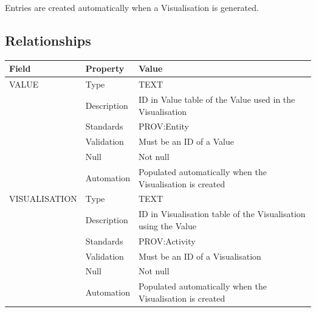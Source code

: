 Entries are created automatically when a Visualisation is generated.

\subsection{Relationships}\label{relationships-34}

\begin{longtable}[]{@{}
  >{\raggedright\arraybackslash}p{}
  >{\raggedright\arraybackslash}p{}
  >{\raggedright\arraybackslash}p{}@{}}
\toprule\noalign{}
\begin{minipage}[b]{\linewidth}\raggedright
Field
\end{minipage} & \begin{minipage}[b]{\linewidth}\raggedright
Property
\end{minipage} & \begin{minipage}[b]{\linewidth}\raggedright
Value
\end{minipage} \\
\midrule\noalign{}
\endhead
\bottomrule\noalign{}
\endlastfoot
VALUE & Type & TEXT \\
& Description & ID in Value table of the Value used in the
Visualisation \\
& Standards & PROV:Entity \\
& Validation & Must be an ID of a Value \\
& Null & Not null \\
& Automation & Populated automatically when the Visualisation is
created \\
VISUALISATION & Type & TEXT \\
& Description & ID in Visualisation table of the Visualisation using the
Value \\
& Standards & PROV:Activity \\
& Validation & Must be an ID of a Visualisation \\
& Null & Not null \\
& Automation & Populated automatically when the Visualisation is
created \\
\end{longtable}

